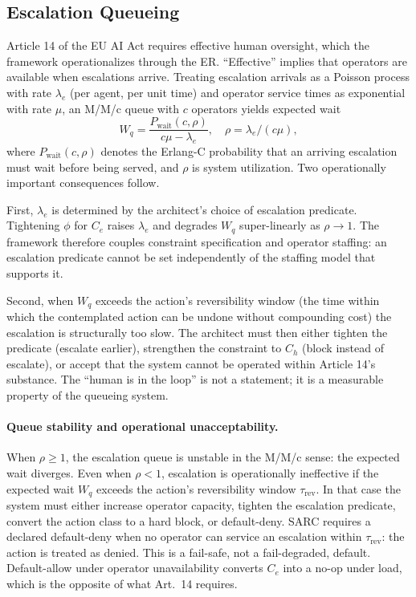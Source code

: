 \documentclass[11pt,a4paper]{article}
\theoremstyle{remark}
\begin{document}
\subsection{Escalation Queueing}\label{sec:queue}

Article 14 of the EU AI Act requires effective human oversight, which the framework operationalizes through the ER. ``Effective'' implies that operators are available when escalations arrive. Treating escalation arrivals as a Poisson process with rate $\lambda_e$ (per agent, per unit time) and operator service times as exponential with rate $\mu$, an M/M/c queue with $c$ operators yields expected wait
\[
    W_q = \frac{P_{\text{wait}}(c, \rho)}{c\mu - \lambda_e}, \quad \rho = \lambda_e/(c\mu),
\]
where $P_{\text{wait}}(c, \rho)$ denotes the Erlang-C probability that an arriving escalation must wait before being served, and $\rho$ is system utilization. Two operationally important consequences follow.

First, $\lambda_e$ is determined by the architect's choice of escalation predicate. Tightening $\phi$ for $C_e$ raises $\lambda_e$ and degrades $W_q$ super-linearly as $\rho \to 1$. The framework therefore couples constraint specification and operator staffing: an escalation predicate cannot be set independently of the staffing model that supports it.

Second, when $W_q$ exceeds the action's reversibility window (the time within which the contemplated action can be undone without compounding cost) the escalation is structurally too slow. The architect must then either tighten the predicate (escalate earlier), strengthen the constraint to $C_h$ (block instead of escalate), or accept that the system cannot be operated within Article 14's substance. The ``human is in the loop'' is not a statement; it is a measurable property of the queueing system.

\paragraph{Queue stability and operational unacceptability.} When $\rho \geq 1$, the escalation queue is unstable in the M/M/c sense: the expected wait diverges. Even when $\rho < 1$, escalation is operationally ineffective if the expected wait $W_q$ exceeds the action's reversibility window $\tau_{\text{rev}}$. In that case the system must either increase operator capacity, tighten the escalation predicate, convert the action class to a hard block, or default-deny. SARC requires a declared default-deny when no operator can service an escalation within $\tau_{\text{rev}}$: the action is treated as denied. This is a fail-safe, not a fail-degraded, default. Default-allow under operator unavailability converts $C_e$ into a no-op under load, which is the opposite of what Art.~14 requires.
\end{document}
